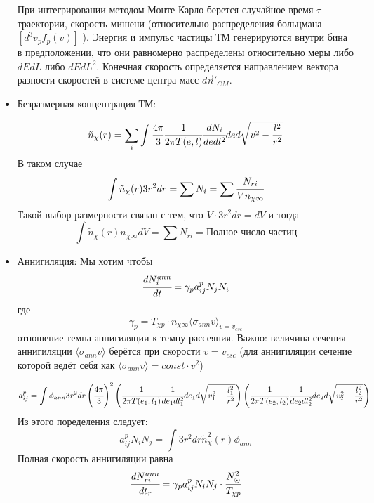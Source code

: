 \begin{itemize}
		При интегрировании методом Монте-Карло берется случайное время $\tau$ траектории, скорость мишени (относительно распределения больцмана $ \left[ d^3v_p f_p(v) \right]$ ). Энергия и импульс частицы ТМ генерируются внутри бина в предположении, что они равномерно распределены относительно меры либо $dEdL$ либо $dEdL^2$. Конечная скорость определяется направлением вектора разности скоростей в системе центра масс $d\vec{n}'_{CM}$.
		
		\item Безразмерная концентрация ТМ:
		
		\begin{equation*}
			\tilde{n}_{\chi}(r) = \sum_i{\int{\cfrac{4\pi}{3} \cfrac{1}{2\pi T(e,l)} \cfrac{dN_i}{dedl^2} de d\sqrt{v^2-\frac{l^2}{r^2}} }}
		\end{equation*}
		 В таком случае
		 \begin{equation*}
		 	\int{\tilde{n}_{\chi}(r) 3r^2dr} = \sum{N_i} = \sum{\cfrac{N_{ri}}{V n_{\chi \infty}}}
		 \end{equation*}
		 Такой выбор размерности связан с тем, что $V \cdot 3r^2dr = dV$ и тогда
		 \begin{equation*}
		 	\int{\tilde{n}_{\chi}(r) n_{\chi \infty} dV} = \sum{N_{ri}} = \text{Полное число частиц}
		 \end{equation*}
		\item Аннигиляция:
		Мы хотим чтобы
		\begin{equation}
			\cfrac{d N_{i}^{ann}}{dt} = \gamma_p a^{p}_{ij} N_j N_i
		\end{equation}
		где 
		\begin{equation*}
			\gamma_p = T_{\chi p} \cdot n_{\chi \infty} \langle\sigma_{ann} v\rangle_{v = v_{esc}}
		\end{equation*}
		отношение темпа аннигиляции к темпу рассеяния. Важно: величина сечения аннигиляции $\langle\sigma_{ann} v\rangle$ берётся при скорости $v = v_{esc}$ (для аннигиляции сечение которой ведёт себя как $\langle\sigma_{ann} v\rangle = const\cdot v^2$)
		
		\begin{equation*}
			a_{ij}^p = \int{\phi_{ann} 3r^2dr\left(\cfrac{4\pi}{3}\right)^2 \left( \cfrac{1}{2\pi T(e_1,l_1)} \cfrac{1}{de_1dl_1^2} de_1 d\sqrt{v_1^2-\frac{l_1^2}{r^2}} \right) \left( \cfrac{1}{2\pi T(e_2,l_2)} \cfrac{1}{de_2dl_2^2} de_2 d\sqrt{v_2^2-\frac{l_2^2}{r^2}} \right)}
		\end{equation*}
		Из этого поределения следует:
		\begin{equation*}
			a_{ij}^p N_i N_j = \int{3r^2dr \tilde{n}^2_{\chi}(r) \phi_{ann}}
		\end{equation*}
		Полная скорость аннигиляции равна
		\begin{equation*}
			\cfrac{dN^{ann}_{ri}}{dt_r} = \gamma_p a_{ij}^p N_i N_j \cdot \cfrac{N^2_{\odot}}{T_{\chi p}}
		\end{equation*}
		
	\end{itemize}
 
	
	

